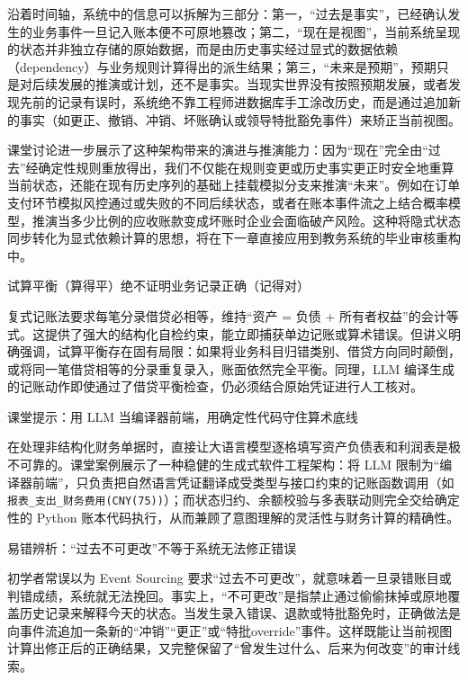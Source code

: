 \documentclass[UTF8,a4paper,11pt,fontset=fandol]{ctexart}
\begin{document}
沿着时间轴，系统中的信息可以拆解为三部分：第一，“过去是事实”，已经确认发生的业务事件一旦记入账本便不可原地篡改；第二，“现在是视图”，当前系统呈现的状态并非独立存储的原始数据，而是由历史事实经过显式的数据依赖（dependency）与业务规则计算得出的派生结果；第三，“未来是预期”，预期只是对后续发展的推演或计划，还不是事实。当现实世界没有按照预期发展，或者发现先前的记录有误时，系统绝不靠工程师进数据库手工涂改历史，而是通过追加新的事实（如更正、撤销、冲销、坏账确认或领导特批豁免事件）来矫正当前视图。

课堂讨论进一步展示了这种架构带来的演进与推演能力：因为“现在”完全由“过去”经确定性规则重放得出，我们不仅能在规则变更或历史事实更正时安全地重算当前状态，还能在现有历史序列的基础上挂载模拟分支来推演“未来”。例如在订单支付环节模拟风控通过或失败的不同后续状态，或者在账本事件流之上结合概率模型，推演当多少比例的应收账款变成坏账时企业会面临破产风险。这种将隐式状态同步转化为显式依赖计算的思想，将在下一章直接应用到教务系统的毕业审核重构中。

\begin{importantbox}{试算平衡（算得平）绝不证明业务记录正确（记得对）}

复式记账法要求每笔分录借贷必相等，维持“资产 = 负债 + 所有者权益”的会计等式。这提供了强大的结构化自检约束，能立即捕获单边记账或算术错误。但讲义明确强调，试算平衡存在固有局限：如果将业务科目归错类别、借贷方向同时颠倒，或将同一笔借贷相等的分录重复录入，账面依然完全平衡。同理，LLM 编译生成的记账动作即使通过了借贷平衡检查，仍必须结合原始凭证进行人工核对。

\end{importantbox}

\begin{knowledgebox}{课堂提示：用 LLM 当编译器前端，用确定性代码守住算术底线}

在处理非结构化财务单据时，直接让大语言模型逐格填写资产负债表和利润表是极不可靠的。课堂案例展示了一种稳健的生成式软件工程架构：将 LLM 限制为“编译器前端”，只负责把自然语言凭证翻译成受类型与接口约束的记账函数调用（如 \texttt{报表\_支出\_财务费用(CNY(75))}）；而状态归约、余额校验与多表联动则完全交给确定性的 Python 账本代码执行，从而兼顾了意图理解的灵活性与财务计算的精确性。

\end{knowledgebox}

\begin{warningbox}{易错辨析：“过去不可更改”不等于系统无法修正错误}

初学者常误以为 Event Sourcing 要求“过去不可更改”，就意味着一旦录错账目或判错成绩，系统就无法挽回。事实上，“不可更改”是指禁止通过偷偷抹掉或原地覆盖历史记录来解释今天的状态。当发生录入错误、退款或特批豁免时，正确做法是向事件流追加一条新的“冲销”“更正”或“特批override”事件。这样既能让当前视图计算出修正后的正确结果，又完整保留了“曾发生过什么、后来为何改变”的审计线索。

\end{warningbox}
\end{document}
